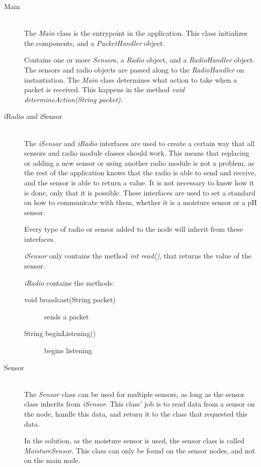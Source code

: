 \begin{description}
\item[Main] \hfill \\
The \textit{Main} class is the entrypoint in the application. This class initializes the components, and a \textit{PacketHandler} object.

Contains one or more \textit{Sensor}s, a \textit{Radio} object, and a \textit{RadioHandler} object. The sensors and radio objects are passed along to the \textit{RadioHandler} on instantiation.
The \textit{Main} class determines what action to take when a packet is received. This happens in the method \textit{void determineAction(String packet)}.

\item[iRadio and iSensor] \hfill \\
The \textit{iSensor} and \textit{iRadio} interfaces are used to create a certain way that all sensors and radio module classes should work. This means that replacing or adding a new sensor or using another radio module is not a problem, as the rest of the application knows that the radio is able to send and receive, and the sensor is able to return a value. 
It is not necessary to know how it is done, only that it is possible. These interfaces are used to set a standard on how to communicate with them, whether it is a moisture sensor or a pH sensor.

Every type of radio or sensor added to the node will inherit from these interfaces.


\textit{iSensor} only contains the method \textit{int read()}, that returns the value of the sensor.

\textit{iRadio} contains the methods:
\begin{description}
\item[void broadcast(String packet)] sends a packet
\item[String beginListening()] begins listening
\end{description}

\item[Sensor] \hfill \\
The \textit{Sensor} class can be used for multiple sensors, as long as the sensor class inherits from \textit{iSensor}. This class' job is to read data from a sensor on the node, handle this data, and return it to the class that requested this data.

In the solution, as the moisture sensor is used, the sensor class is called \textit{MoistureSensor}. This class can only be found on the sensor nodes, and not on the main node.



\end{description}
